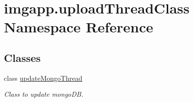 \hypertarget{namespaceimgapp_1_1uploadThreadClass}{}\section{imgapp.\+upload\+Thread\+Class Namespace Reference}
\label{namespaceimgapp_1_1uploadThreadClass}
\subsection*{Classes}
\begin{DoxyCompactItemize}
\item 
class \hyperlink{classimgapp_1_1uploadThreadClass_1_1updateMongoThread}{update\+Mongo\+Thread}
\begin{DoxyCompactList}\small\item\em Class to update mongo\+DB. \end{DoxyCompactList}\end{DoxyCompactItemize}

